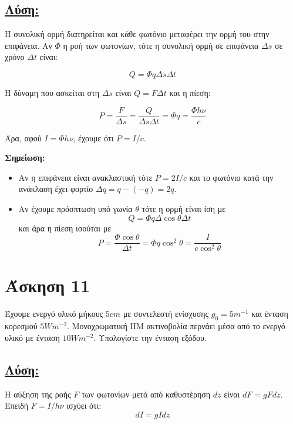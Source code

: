 \documentclass[a4paper,11pt,titlepage]{article}
\numberwithin{equation}{section} %
\begin{document}
\subsection*{\underline{Λύση:}}

Η συνολική ορμή διατηρείται και κάθε φωτόνιο μεταφέρει την ορμή του στην επιφάνεια. Αν $\Phi$ η ροή των φωτονίων, τότε η συνολική ορμή σε επιφάνεια ${\Delta}s$ σε χρόνο $\Delta t$ είναι:

\begin{equation}
 Q=\Phi q\Delta s\Delta t
\end{equation}

Η δύναμη που ασκείται στη $\Delta s$ είναι $Q=F\Delta t$ και η πίεση:

\begin{equation}
 P=\dfrac{F}{\Delta s}=\dfrac{Q}{\Delta s\Delta t}=\Phi q=\dfrac{\Phi h\nu}{c}
\end{equation}

Άρα, αφού $I=\Phi h\nu$, έχουμε ότι $P=I/c$.

\textbf{Σημείωση:}
\begin{itemize}
 \item Αν η επιφάνεια είναι ανακλαστική τότε $P=2I/c$ και το φωτόνιο κατά την ανάκλαση έχει φορτίο $\Delta q=q-(-q)=2q$.
 \item Αν έχουμε πρόσπτωση υπό γωνία $\theta$ τότε η ορμή είναι ίση με 
\begin{equation}
Q=\Phi q\Delta \cos\theta \Delta t 
\end{equation}
και άρα η πίεση ισούται με
\begin{equation}
 P=\dfrac{\Phi \cos\theta}{\Delta t}=\Phi q\cos^2\theta=\dfrac{I}{c\cos^2\theta}
\end{equation}
\end{itemize}


\section{Άσκηση 11} 

Έχουμε ενεργό υλικό μήκους $5cm$  με συντελεστή ενίσχυσης $g_0=5m^{-1}$ και ένταση κορεσμού $5Wm^{-2}$. Μονοχρωματική ΗΜ ακτινοβολία περνάει μέσα  από το ενεργό υλικό με ένταση $10Wm^{-2}$. Υπολογίστε την ένταση εξόδου.

\subsection*{\underline{Λύση:}}

Η αύξηση της ροής $F$ των φωτονίων μετά από καθυστέρηση $dz$ είναι $dF=gFdz$. Επειδή $F=I/h\nu$ ισχύει ότι:
\begin{equation}
 dI=gIdz
\end{equation}
\end{document}

